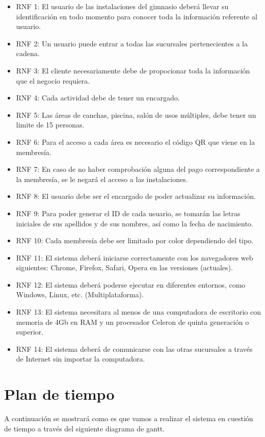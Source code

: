 \documentclass[12pt,letterpaper]{article}
\begin{document}
\begin{itemize}
	
	\item RNF 1: El usuario de las instalaciones del gimnasio deberá llevar su identificación en todo momento para conocer toda la información referente al usuario.
\item RNF 2: Un usuario puede entrar a todas las sucursales pertenecientes a la cadena. 
\item RNF 3: El cliente necesariamente debe de propocionar toda la información que el negocio requiera.
\item RNF 4: Cada actividad debe de tener un encargado.
\item RNF 5: Las áreas de canchas, piscina, salón de usos múltiples, debe tener un limite de 15 personas.
\item RNF 6: Para el acceso a cada área es necesario el código QR que viene en la membresía.
\item RNF 7: En caso de no haber comprobación alguna del pago correspondiente a la membresía, se le negará el acceso a las instalaciones.
\item RNF 8: El usuario debe ser el encargado de poder actualizar su información.
\item RNF 9: Para poder generar el ID de cada usuario, se tomarán las letras iniciales de sus apellidos y de sus nombres, así como la fecha de nacimiento.
\item RNF 10: Cada membresía debe ser limitado por color dependiendo del tipo. 	
\item RNF 11: El sistema deberá iniciarse correctamente con los navegadores web siguientes: Chrome, Firefox, Safari, Opera en las versiones (actuales).
\item RNF 12: El sistema deberá poderse ejecutar en diferentes entornos, como Windows, Linux, etc. (Multiplataforma).	 
\item RNF 13: El sistema necesitara al menos de una computadora de escritorio con memoria de 4Gb en RAM y un procesador Celeron de quinta generación o superior.
\item RNF 14: El sistema deberá de comunicarse con las otras sucursales a través de Internet sin importar la computadora.
	 
\end{itemize}

\section{Plan de tiempo}
A continuación se mostrará como es que vamos a realizar el sistema en cuestión de tiempo a través del siguiente diagrama de gantt.
\\ \\ \\ \\ \\ \\ \\ \\
\end{document}
